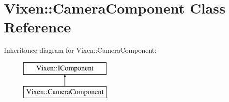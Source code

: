 \hypertarget{class_vixen_1_1_camera_component}{}\section{Vixen\+:\+:Camera\+Component Class Reference}
\label{class_vixen_1_1_camera_component}
Inheritance diagram for Vixen\+:\+:Camera\+Component\+:\begin{figure}[H]
\begin{center}
\leavevmode
\includegraphics[height=2.000000cm]{class_vixen_1_1_camera_component}
\end{center}
\end{figure}
